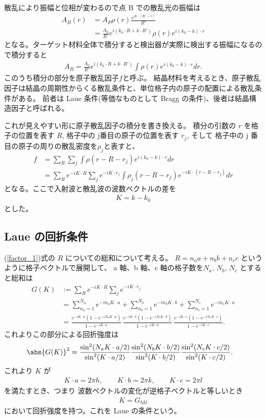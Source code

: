 \documentclass[11pt,dvipdfmx,a4paper]{jsarticle}
\begin{document}
散乱により振幅と位相が変わるので点 B での散乱光の振幅は
\begin{align}
	A_B(r) &= A_P \rho(r) \frac{e^{ik\cdot(R'-r)}}{R'}\\
	&=\frac{A_0}{R'}e^{i(k_0 \cdot R+ k \cdot R')}\rho(r)e^{i(k_0-k)\cdot r}
\end{align}
となる。ターゲット材料全体で積分すると検出器が実際に検出する振幅になるので積分すると
\begin{align}
	A_B =\frac{A_0}{R'}e^{i(k_0 \cdot R+ k \cdot R')}\int \rho(r) e^{i(k_0-k)\cdot r} dr.
\end{align}
このうち積分の部分を原子散乱因子\(f\)と呼ぶ。
結晶材料を考えるとき、原子散乱因子は結晶の周期性からくる散乱条件と、単位格子内の原子の配置による散乱条件がある。
前者は Laue 条件(等価なものとして Bragg の条件)、後者は結晶構造因子と呼ばれる。

これが見えやすい形に原子散乱因子の積分を書き換える。
積分の引数の \(r\) を格子の位置を表す \(R\), 格子中の j番目の原子の位置を表す \(r_j\), そして
格子中の j 番目の原子の周りの散乱密度を\(\rho_j\)と表すと、
\begin{align}
	f&=\sum_R \sum_{j} \int\rho(r-R-r_j)e^{i(k_0-k)\cdot r} dr\\
	&=\sum_R e^{-iK\cdot R}\sum_j e^{-iK\cdot r_j} \int \rho_j(r-R-r_j) e^{-iK\cdot(r-R-r_j)}dr\label{factor_1}
\end{align}
となる。ここで入射波と散乱波の波数ベクトルの差を
\begin{align}
	K = k -k_0
\end{align}
とした。

\subsection{Laue の回折条件}
(\ref{factor_1})式の \(R\) についての総和について考える。
\(R = n_a a + n_b b + n_c c\) というように格子ベクトルで展開して、
a 軸、b 軸、c 軸の格子数を\(N_a,\,N_b,\,N_c\) とすると総和は
\begin{align}
	G(K) &:= \sum_R e^{-iK\cdot R}\sum_j e^{-iK\cdot r_j}\\
	&= \sum_{n_a=1}^{N_a} e^{-in_aK\cdot a} + \sum_{n_b=1}^{N_b} e^{-in_bK\cdot b} + \sum_{n_c=1}^{N_c} e^{-in_cK\cdot a}\\
	&=\frac{e^{-iK\cdot a} (1-e^{-iN_a K\cdot a})}{1-e^{-iK\cdot a}}\,
	\frac{e^{-iK\cdot b} (1-e^{-iN_b K\cdot b})}{1-e^{-iK\cdot b}}\,
	\frac{e^{-iK\cdot c} (1-e^{-iN_c K\cdot c})}{1-e^{-iK\cdot c}} .
\end{align}
これよりこの部分による回折強度は
\begin{align}
	\abs{G(K)}^2 &= \dfrac{\sin^2(N_a K\cdot a/2)}{\sin^2(K\cdot a/2)}
	\dfrac{\sin^2(N_b K\cdot b/2)}{\sin^2(K\cdot b/2)}
	\dfrac{\sin^2(N_c K\cdot c/2)}{\sin^2(K\cdot c/2)} .
\end{align}
これより \(K\) が
\begin{align}
	K\cdot a = 2\pi h, \qquad K\cdot b =2\pi k, \qquad K\cdot c =2\pi l
\end{align}
を満たすとき、つまり 波数ベクトルの変化が逆格子ベクトルと等しいとき
\begin{align}
	K = G_{hkl}
\end{align}
において回折強度を持つ。これを Laue の条件という。
\end{document}
